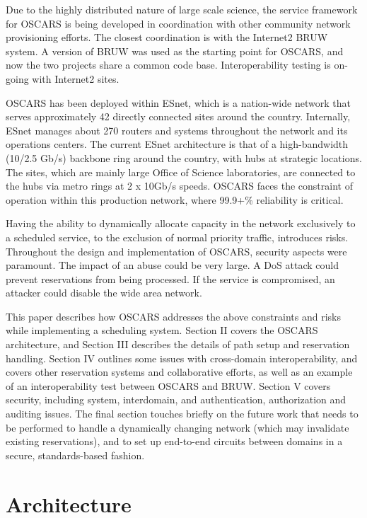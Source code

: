 \documentclass[conference]{IEEEtran}
\begin{document}
Due to the highly distributed nature of large scale science,
the service framework for OSCARS is being
developed in coordination with other community network provisioning efforts. 
The closest coordination is with the Internet2 BRUW \cite{riddle}
system. 
A version of BRUW was used as the starting point for OSCARS, and now the two 
projects share a common code base. Interoperability testing is on-going with 
Internet2 sites. 

OSCARS has been deployed within ESnet,
which is a nation-wide network that serves approximately 42 directly connected 
sites around the country.  Internally, ESnet manages about 270 routers and 
systems throughout the network and its operations centers.  The current ESnet 
architecture is that of a high-bandwidth (10/2.5 Gb/s) backbone ring 
around the country, with hubs at strategic locations.  The sites, which are 
mainly
large Office of Science laboratories, are connected to the hubs via metro rings at 2 x 10Gb/s speeds.
OSCARS faces the constraint of operation within this production 
network, where 99.9+\% reliability is critical.

Having the ability to dynamically allocate capacity in the network exclusively 
to a scheduled service, to the exclusion of normal priority traffic, introduces 
risks.
Throughout the design and implementation of OSCARS, security aspects were
paramount.  The impact of an abuse could be very
large.  A DoS attack could prevent reservations from being processed.  If the
service is compromised, an attacker could disable the wide area network.

This paper describes how OSCARS addresses the above constraints and
risks while implementing a scheduling system.  Section II covers the 
OSCARS architecture, and Section III describes the details of
path setup and reservation handling. Section IV outlines some issues with cross-domain
interoperability, and covers other reservation systems and 
collaborative efforts, as well as 
an example of an interoperability test between OSCARS and BRUW.
Section V covers security, including system, interdomain, and authentication,
authorization and auditing issues.
The final section touches briefly on the future work that needs to be performed
to handle a dynamically changing network (which may invalidate existing
reservations), and to set up end-to-end circuits between domains
in a secure, standards-based fashion.

\section{Architecture}
\end{document}
